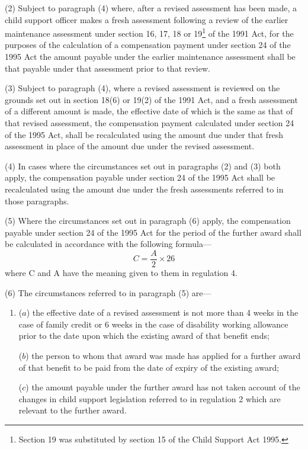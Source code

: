 \documentclass[a4paper]{article}
\begin{document}
(2) Subject to paragraph (4) where, after a revised assessment has been made, a child support officer makes a fresh assessment following a review of the earlier maintenance assessment under section 16, 17, 18 or 19\footnote{Section 19 was substituted by section 15 of the Child Support Act 1995.} of the 1991 Act, for the purposes of the calculation of a compensation payment under section 24 of the 1995 Act the amount payable under the earlier maintenance assessment shall be that payable under that assessment prior to that review.

(3) Subject to paragraph (4), where a revised assessment is reviewed on the grounds set out in section 18(6) or 19(2) of the 1991 Act, and a fresh assessment of a different amount is made, the effective date of which is the same as that of that revised assessment, the compensation payment calculated under section 24 of the 1995 Act, shall be recalculated using the amount due under that fresh assessment in place of the amount due under the revised assessment.

(4) In cases where the circumstances set out in paragraphs (2) and (3) both apply, the compensation payable under section 24 of the 1995 Act shall be recalculated using the amount due under the fresh assessments referred to in those paragraphs.

(5) Where the circumstances set out in paragraph (6) apply, the compensation payable under section 24 of the 1995 Act for the period of the further award shall be calculated in accordance with the following formula—
\[C = \frac{A}{2} \times 26\]
where C and A have the meaning given to them in regulation 4.

(6) The circumstances referred to in paragraph (5) are—
\begin{enumerate}\item[]
($a$) the effective date of a revised assessment is not more than 4 weeks in the case of family credit or 6 weeks in the case of disability working allowance prior to the date upon which the existing award of that benefit ends;

($b$) the person to whom that award was made has applied for a further award of that benefit to be paid from the date of expiry of the existing award;

($c$) the amount payable under the further award has not taken account of the changes in child support legislation referred to in regulation 2 which are relevant to the further award.
\end{enumerate}
\end{document}
